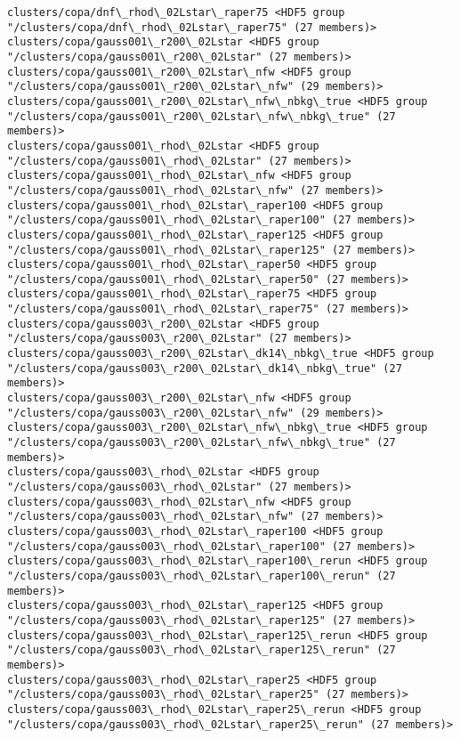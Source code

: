 \documentclass[11pt]{article}
\begin{document}
\begin{Verbatim}[commandchars=\\\{\}]
clusters/copa/dnf\_rhod\_02Lstar\_raper75 <HDF5 group "/clusters/copa/dnf\_rhod\_02Lstar\_raper75" (27 members)>
clusters/copa/gauss001\_r200\_02Lstar <HDF5 group "/clusters/copa/gauss001\_r200\_02Lstar" (27 members)>
clusters/copa/gauss001\_r200\_02Lstar\_nfw <HDF5 group "/clusters/copa/gauss001\_r200\_02Lstar\_nfw" (29 members)>
clusters/copa/gauss001\_r200\_02Lstar\_nfw\_nbkg\_true <HDF5 group "/clusters/copa/gauss001\_r200\_02Lstar\_nfw\_nbkg\_true" (27 members)>
clusters/copa/gauss001\_rhod\_02Lstar <HDF5 group "/clusters/copa/gauss001\_rhod\_02Lstar" (27 members)>
clusters/copa/gauss001\_rhod\_02Lstar\_nfw <HDF5 group "/clusters/copa/gauss001\_rhod\_02Lstar\_nfw" (27 members)>
clusters/copa/gauss001\_rhod\_02Lstar\_raper100 <HDF5 group "/clusters/copa/gauss001\_rhod\_02Lstar\_raper100" (27 members)>
clusters/copa/gauss001\_rhod\_02Lstar\_raper125 <HDF5 group "/clusters/copa/gauss001\_rhod\_02Lstar\_raper125" (27 members)>
clusters/copa/gauss001\_rhod\_02Lstar\_raper50 <HDF5 group "/clusters/copa/gauss001\_rhod\_02Lstar\_raper50" (27 members)>
clusters/copa/gauss001\_rhod\_02Lstar\_raper75 <HDF5 group "/clusters/copa/gauss001\_rhod\_02Lstar\_raper75" (27 members)>
clusters/copa/gauss003\_r200\_02Lstar <HDF5 group "/clusters/copa/gauss003\_r200\_02Lstar" (27 members)>
clusters/copa/gauss003\_r200\_02Lstar\_dk14\_nbkg\_true <HDF5 group "/clusters/copa/gauss003\_r200\_02Lstar\_dk14\_nbkg\_true" (27 members)>
clusters/copa/gauss003\_r200\_02Lstar\_nfw <HDF5 group "/clusters/copa/gauss003\_r200\_02Lstar\_nfw" (29 members)>
clusters/copa/gauss003\_r200\_02Lstar\_nfw\_nbkg\_true <HDF5 group "/clusters/copa/gauss003\_r200\_02Lstar\_nfw\_nbkg\_true" (27 members)>
clusters/copa/gauss003\_rhod\_02Lstar <HDF5 group "/clusters/copa/gauss003\_rhod\_02Lstar" (27 members)>
clusters/copa/gauss003\_rhod\_02Lstar\_nfw <HDF5 group "/clusters/copa/gauss003\_rhod\_02Lstar\_nfw" (27 members)>
clusters/copa/gauss003\_rhod\_02Lstar\_raper100 <HDF5 group "/clusters/copa/gauss003\_rhod\_02Lstar\_raper100" (27 members)>
clusters/copa/gauss003\_rhod\_02Lstar\_raper100\_rerun <HDF5 group "/clusters/copa/gauss003\_rhod\_02Lstar\_raper100\_rerun" (27 members)>
clusters/copa/gauss003\_rhod\_02Lstar\_raper125 <HDF5 group "/clusters/copa/gauss003\_rhod\_02Lstar\_raper125" (27 members)>
clusters/copa/gauss003\_rhod\_02Lstar\_raper125\_rerun <HDF5 group "/clusters/copa/gauss003\_rhod\_02Lstar\_raper125\_rerun" (27 members)>
clusters/copa/gauss003\_rhod\_02Lstar\_raper25 <HDF5 group "/clusters/copa/gauss003\_rhod\_02Lstar\_raper25" (27 members)>
clusters/copa/gauss003\_rhod\_02Lstar\_raper25\_rerun <HDF5 group "/clusters/copa/gauss003\_rhod\_02Lstar\_raper25\_rerun" (27 members)>

\end{Verbatim}
\end{document}
